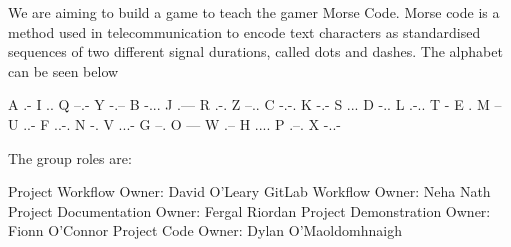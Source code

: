 We are aiming to build a game to teach the gamer Morse Code. Morse code is a method used in telecommunication to encode text characters as standardised sequences of two different signal durations, called dots and dashes. The alphabet can be seen below \begin{DoxyVerb}    A .-             I ..            Q --.-          Y -.-- 
    B -...           J .---          R .-.           Z --..
    C -.-.           K -.-           S ... 
    D -..            L .-..          T - 
    E .              M --            U ..- 
    F ..-.           N -.            V ...- 
    G --.            O ---           W .-- 
    H ....           P .--.          X -..- 
\end{DoxyVerb}
 The group roles are\+: \begin{DoxyVerb}    Project Workflow Owner: David O'Leary
    GitLab Workflow Owner: Neha Nath
    Project Documentation Owner: Fergal Riordan
    Project Demonstration Owner: Fionn O'Connor
    Project Code Owner: Dylan O'Maoldomhnaigh
\end{DoxyVerb}
 